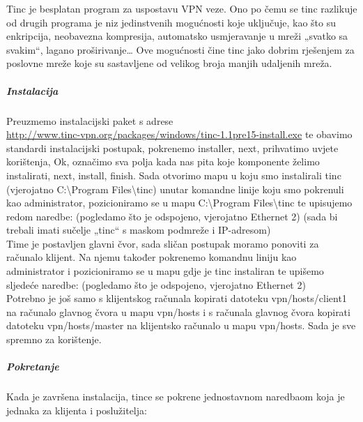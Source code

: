 \hfill \smallbreak
Tinc je besplatan program za uspostavu VPN veze. Ono po čemu se tinc razlikuje od drugih programa je niz jedinstvenih mogućnosti koje uključuje, kao što su enkripcija, neobavezna kompresija, automatsko usmjeravanje u mreži „svatko sa svakim“, lagano proširivanje… Ove mogućnosti čine tinc jako dobrim rješenjem za poslovne mreže koje su sastavljene od velikog broja manjih udaljenih mreža.

\subparagraph{Instalacija}
\hfill \smallbreak
Preuzmemo instalacijski paket s adrese\\ 
\url{http://www.tinc-vpn.org/packages/windows/tinc-1.1pre15-install.exe} te obavimo standardi instalacijski postupak, pokrenemo installer, next, prihvatimo uvjete korištenja, Ok, označimo sva polja kada nas pita koje komponente želimo instalirati, next, install, finish. Sada otvorimo mapu u koju smo instalirali tinc (vjerojatno C:\textbackslash Program Files\textbackslash tinc) unutar komandne linije koju smo pokrenuli kao administrator, pozicioniramo se u mapu C:\textbackslash Program Files\textbackslash tinc te upisujemo redom naredbe:
\FloatBarrier
\smallbreak {}
\smallbreak {}
\smallbreak {}
\smallbreak {}
\smallbreak {}
\smallbreak {}
\smallbreak {}    (pogledamo što je odspojeno, vjerojatno Ethernet 2)
\smallbreak {}
\smallbreak {}
\smallbreak {}  (sada bi trebali imati sučelje „tinc“ s maskom podmreže i IP-adresom)\\
\FloatBarrier
Time je postavljen glavni čvor, sada sličan postupak moramo ponoviti za računalo klijent. Na njemu također pokrenemo komandnu liniju kao administrator i pozicioniramo se u mapu gdje je tinc instaliran te upišemo sljedeće naredbe:
\FloatBarrier
\smallbreak {}
\smallbreak {}
\smallbreak {}
\smallbreak {}
\smallbreak {}
\smallbreak {}
\smallbreak {}   (pogledamo što je odspojeno, vjerojatno Ethernet 2)
\smallbreak {}
\smallbreak {}\\
\FloatBarrier
Potrebno je još samo s klijentskog računala kopirati datoteku vpn/hosts/client1 na računalo glavnog čvora u mapu vpn/hosts
i s računala glavnog čvora kopirati datoteku vpn/hosts/master na klijentsko računalo u mapu vpn/hosts. Sada je sve spremno za korištenje.

\subparagraph{Pokretanje}
\hfill \smallbreak
Kada je završena instalacija, tince se pokrene jednostavnom naredbaom koja je jednaka za klijenta i poslužitelja:
\FloatBarrier
\smallbreak {}